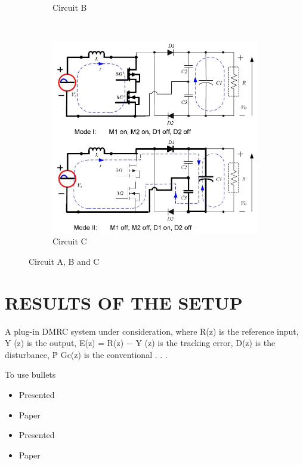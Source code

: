 \begin{figure}[h]
\begin{subfigure}[b]{0.3\textwidth}
                \caption{Circuit B}
                \label{fig:Circuit B}
        \end{subfigure}
        ~ %
        \begin{subfigure}[b]{0.3\textwidth}
                \includegraphics[width=\textwidth]{5}
                \caption{Circuit C}
                \label{fig:Circuit C}
        \end{subfigure}
        \caption{Circuit A, B and C}\label{fig:Circuits}
\end{figure}



\chapter{ RESULTS OF THE SETUP}


A plug-in DMRC system under consideration, where R(z) is the reference input, Y (z) is the output, E(z) = R(z) − Y (z) is the tracking error, D(z) is the disturbance, \.{P}
Gc(z) is the conventional . . .


To use bullets

\begin{itemize}
\item{Presented}
\item{Paper  }
\item{Presented}
\item{Paper  }
\end{itemize}

